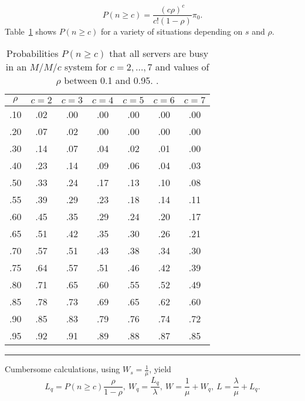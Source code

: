 $$ P( n \geq c) =  \frac{\left(c \rho\right)^{c}}{c! \left(1-\rho\right)} \pi_{0}.$$ 
Table~\ref{tab:pns} shows $P( n \geq c)$ for a variety of situations depending on $s$ and $\rho$.  
\begin{table}[!t]
\centering
\begin{tabular}{ccccccc}
\hline
$\rho$ & $c=2$ & $c=3$ & $c=4$ & $c=5$ & $c=6$ & $c=7$ \\
 \hline
.10& .02& .00& .00& .00& .00& .00 \\
.20& .07& .02& .00& .00& .00& .00 \\
.30& .14& .07& .04& .02& .01& .00 \\
.40& .23& .14& .09& .06& .04& .03 \\
.50& .33& .24& .17& .13& .10& .08 \\
.55& .39& .29& .23& .18& .14& .11 \\
.60& .45& .35& .29& .24& .20& .17 \\
.65& .51& .42& .35& .30& .26& .21 \\
.70& .57& .51& .43& .38& .34& .30 \\
.75& .64& .57& .51& .46& .42& .39 \\
.80& .71& .65& .60& .55& .52& .49 \\
.85& .78& .73& .69& .65& .62& .60 \\
.90& .85& .83& .79& .76& .74& .72 \\
.95& .92& .91& .89& .88& .87& .85 \\
\hline
\end{tabular}
\caption{\small Probabilities $P(n\geq c)$ that all servers are busy in an $M/M/c$ system for $c=2,\ldots, 7$ and values of $\rho$ between 0.1 and 0.95. \cite[p.1088]{QS_W}.}\label{tab:pns}\hrule
\end{table}\afterpage{\FloatBarrier}
Cumbersome calculations, using $W_{s} = \frac{1}{\mu}$, yield $$ L_{q} = P( n \geq c) \frac{\rho}{1-\rho}, \ 
W_{q} = \frac{L_{q}}{\lambda}, \ 
W = \frac{1}{\mu} + W_{q}, \ 
 L = \frac{\lambda}{\mu} + L_{q}.$$
\newpage\noindent 

